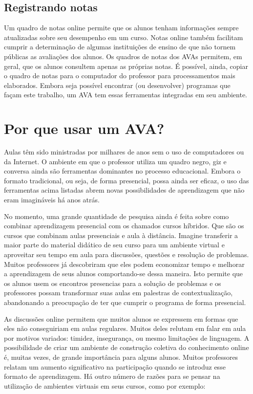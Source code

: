 \subsection{Registrando notas}


Um quadro de notas online permite que os alunos tenham informações sempre atualizadas sobre seu desempenho em um curso. Notas online também facilitam cumprir a determinação de algumas instituições de ensino de que não tornem públicas as avaliações dos alunos. Os quadros de notas dos AVAs permitem, em geral, que os alunos consultem apenas as próprias notas. É possível, ainda, copiar o quadro de notas para o computador do professor para processamentos mais elaborados. Embora seja possível encontrar (ou desenvolver) programas que façam este trabalho, um AVA tem essas ferramentas integradas em seu ambiente. 

\section{Por que usar um AVA?}

Aulas têm sido ministradas por milhares de anos sem o uso de computadores ou da Internet. O ambiente em que o professor utiliza um quadro negro, giz e conversa ainda são ferramentas dominantes no processo educacional. Embora o formato tradicional, ou seja, de forma presencial, possa ainda ser eficaz, o uso das ferramentas acima listadas abrem novas possibilidades de aprendizagem que não eram imagináveis há anos atrás.

No momento, uma grande quantidade de pesquisa ainda é feita sobre como combinar aprendizagem presencial com os chamados cursos híbridos. Que são os cursos que combinam aulas presenciais e aula à distância. Imagine transferir a maior parte do material didático de seu curso para um ambiente virtual e aproveitar seu tempo em aula para discussões, questões e resolução de problemas. Muitos professores já descobriram que eles podem economizar tempo e melhorar a aprendizagem de seus alunos comportando-se dessa maneira. Isto permite que os alunos usem os encontros presencias para a solução de problemas e os professores possam transformar suas aulas em palestras de contextualização, abandonando a preocupação de ter que cumprir o programa de forma presencial.

As discussões online permitem que muitos alunos se expressem em formas que eles não conseguiriam em aulas regulares. Muitos deles relutam em falar em aula por motivos variados: timidez, insegurança, ou mesmo limitações de linguagem. A possibilidade de criar um ambiente de construção coletiva do conhecimento online é, muitas vezes, de grande importância para alguns alunos. Muitos professores relatam um aumento significativo na participação quando se introduz esse formato de aprendizagem. Há outro número de razões para se pensar na utilização de ambientes virtuais em seus cursos, como por exemplo:

